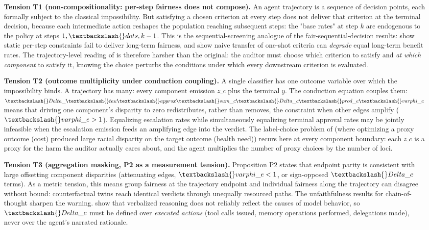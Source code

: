 \documentclass[10pt]{article}
\begin{document}
\textbf{Tension T1 (non-compositionality: per-step fairness does not compose).} An agent trajectory is a sequence of decision points, each formally subject to the classical impossibility. But satisfying a chosen criterion at every step does not deliver that criterion at the terminal decision, because each intermediate action reshapes the population reaching subsequent steps: the "base rates" at step $k$ are endogenous to the policy at steps $1, \textbackslash\{\}dots, k-1$. This is the sequential-screening analogue of the fair-sequential-decision results: \cite{hu2022achieving} show static per-step constraints fail to deliver long-term fairness, and \cite{xu2024adapting} show naive transfer of one-shot criteria can \emph{degrade} equal long-term benefit rates. The trajectory-level reading of \cite{kleinberg2017inherent} is therefore harsher than the original: the auditor must choose which criterion to satisfy and \emph{at which component} to satisfy it, knowing the choice perturbs the conditions under which every downstream criterion is evaluated.

\textbf{Tension T2 (outcome multiplicity under conduction coupling).} A single classifier has one outcome variable over which the impossibility binds. A trajectory has many: every component emission $z\_c$ plus the terminal $y$. The conduction equation couples them: $\textbackslash\{\}Delta\_\textbackslash\{\}tau \textbackslash\{\}approx \textbackslash\{\}sum\_c \textbackslash\{\}Delta\_c \textbackslash\{\}prod\_e \textbackslash\{\}varphi\_e$ means that driving one component's disparity to zero redistributes, rather than removes, the constraint when other edges amplify ($\textbackslash\{\}varphi\_e > 1$). Equalizing escalation rates while simultaneously equalizing terminal approval rates may be jointly infeasible when the escalation emission feeds an amplifying edge into the verdict. The label-choice problem of \cite{obermeyer2019dissecting} (where optimizing a proxy outcome (cost) produced large racial disparity on the target outcome (health need)) recurs here at every component boundary: each $z\_c$ is a proxy for the harm the auditor actually cares about, and the agent multiplies the number of proxy choices by the number of loci.

\textbf{Tension T3 (aggregation masking, P2 as a measurement tension).} Proposition P2 states that endpoint parity is consistent with large offsetting component disparities (attenuating edges, $\textbackslash\{\}varphi\_e < 1$, or sign-opposed $\textbackslash\{\}Delta\_c$ terms). As a metric tension, this means group fairness at the trajectory endpoint and individual fairness along the trajectory can disagree without bound: counterfactual twins reach identical verdicts through unequally resourced paths. The unfaithfulness results for chain-of-thought sharpen the warning. \cite{turpin2023language} show that verbalized reasoning does not reliably reflect the causes of model behavior, so $\textbackslash\{\}Delta\_c$ must be defined over \emph{executed actions} (tool calls issued, memory operations performed, delegations made), never over the agent's narrated rationale.
\end{document}
